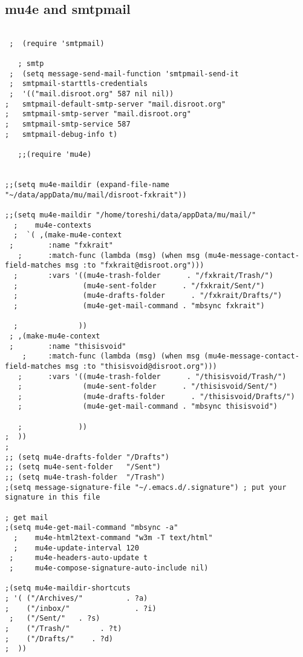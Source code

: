 \documentclass[11pt]{article}
\begin{document}
\subsection{mu4e and smtpmail}
\label{sec:org736c712}
\begin{verbatim}

 ;  (require 'smtpmail)

   ; smtp
 ;  (setq message-send-mail-function 'smtpmail-send-it
 ;  smtpmail-starttls-credentials
 ;  '(("mail.disroot.org" 587 nil nil))
;   smtpmail-default-smtp-server "mail.disroot.org"
;   smtpmail-smtp-server "mail.disroot.org"
;   smtpmail-smtp-service 587
;   smtpmail-debug-info t)

   ;;(require 'mu4e)


;;(setq mu4e-maildir (expand-file-name "~/data/appData/mu/mail/disroot-fxkrait"))

;;(setq mu4e-maildir "/home/toreshi/data/appData/mu/mail/"
  ;    mu4e-contexts
  ;  `( ,(make-mu4e-context
 ;        :name "fxkrait"
   ;      :match-func (lambda (msg) (when msg (mu4e-message-contact-field-matches msg :to "fxkrait@disroot.org")))
  ;       :vars '((mu4e-trash-folder      . "/fxkrait/Trash/")
  ;               (mu4e-sent-folder      . "/fxkrait/Sent/")
  ;               (mu4e-drafts-folder      . "/fxkrait/Drafts/")
  ;               (mu4e-get-mail-command . "mbsync fxkrait")

  ;              ))
 ; ,(make-mu4e-context
 ;        :name "thisisvoid"
    ;     :match-func (lambda (msg) (when msg (mu4e-message-contact-field-matches msg :to "thisisvoid@disroot.org")))
   ;      :vars '((mu4e-trash-folder      . "/thisisvoid/Trash/")
   ;              (mu4e-sent-folder      . "/thisisvoid/Sent/")
   ;              (mu4e-drafts-folder      . "/thisisvoid/Drafts/")
   ;              (mu4e-get-mail-command . "mbsync thisisvoid")

   ;             ))
;  ))
;
;; (setq mu4e-drafts-folder "/Drafts")
;; (setq mu4e-sent-folder   "/Sent")
;; (setq mu4e-trash-folder  "/Trash")
;(setq message-signature-file "~/.emacs.d/.signature") ; put your signature in this file

; get mail
;(setq mu4e-get-mail-command "mbsync -a"
  ;    mu4e-html2text-command "w3m -T text/html"
  ;    mu4e-update-interval 120
 ;     mu4e-headers-auto-update t
 ;     mu4e-compose-signature-auto-include nil)

;(setq mu4e-maildir-shortcuts
; '( ("/Archives/"          . ?a)
;    ("/inbox/"               . ?i)
 ;   ("/Sent/"   . ?s)
;    ("/Trash/"       . ?t)
;    ("/Drafts/"    . ?d)
;  ))


\end{verbatim}
\end{document}
